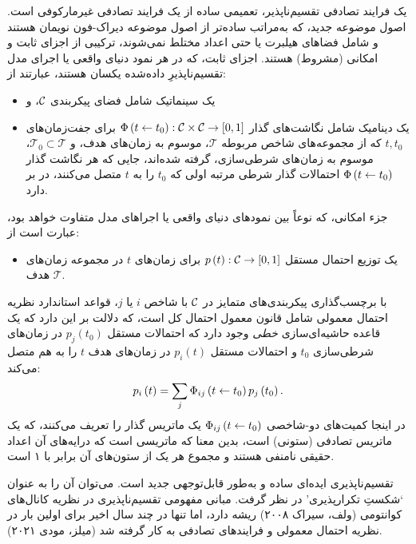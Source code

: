 \documentclass{article}
\newcommand{\stochasticmatrix}{\Phi}
\begin{document}
یک فرایند تصادفی تقسیم‌ناپذیر، تعمیمی ساده از یک فرایند تصادفی غیرمارکوفی است. اصول موضوعه جدید، که به‌مراتب ساده‌تر از اصول موضوعه دیراک-فون نویمان هستند و شامل فضاهای هیلبرت یا حتی اعداد مختلط نمی‌شوند، ترکیبی از اجزای ثابت و امکانی (مشروط) هستند. اجزای ثابت، که در هر نمود دنیای واقعی یا اجرای مدل تقسیم‌ناپذیرِ داده‌شده یکسان هستند، عبارتند از:
\begin{itemize}
\item یک سینماتیک شامل فضای پیکربندی $\mathcal{C}$، و
\item یک دینامیک شامل نگاشت‌های گذار $\mapping{\stochasticmatrix\left(t\from t_{0}\right)}{\configspace\cartesianprod\configspace}{\left[0,1\right]}$
برای جفت‌زمان‌های $t,t_{0}$ که از مجموعه‌های شاخص مربوطه $\mathcal{T}$، موسوم به زمان‌های هدف، و $\mathcal{T}_{0}\subset\mathcal{T}$، موسوم به زمان‌های شرطی‌سازی، گرفته شده‌اند، جایی که هر نگاشت گذار $\stochasticmatrix\left(t\from t_{0}\right)$ احتمالات گذار شرطی مرتبه اولی که $t_{0}$ را به $t$ متصل می‌کنند، در بر دارد.
\end{itemize}
جزء امکانی، که نوعاً بین نمودهای دنیای واقعی یا اجراهای مدل متفاوت خواهد بود، عبارت است از:
\begin{itemize}
\item یک توزیع احتمال مستقل $p\left(t\right):\mathcal{C}\to\left[0,1\right]$
برای زمان‌های $t$ در مجموعه زمان‌های هدف $\mathcal{T}$.
\end{itemize}
با برچسب‌گذاری پیکربندی‌های متمایز در $\mathcal{C}$ با شاخص $i$ یا $j$، قواعد استاندارد نظریه احتمال معمولی شامل قانون معمول احتمال کل است، که دلالت بر این دارد که یک قاعده حاشیه‌ای‌سازی \emph{خطی} وجود دارد که احتمالات مستقل $p_{j}\left(t_{0}\right)$ در زمان‌های شرطی‌سازی $t_{0}$ و احتمالات مستقل $p_{i}\left(t\right)$ در زمان‌های هدف $t$ را به هم متصل می‌کند:
\begin{equation}
p_{i}\left(t\right)=\sum_{j}\stochasticmatrix_{ij}\left(t\from t_{0}\right)p_{j}\left(t_{0}\right).\label{eq:LawOfTotalProbabilityFromTransitionMatrix}
\end{equation}
 در اینجا کمیت‌های دو-شاخصی $\stochasticmatrix_{ij}\left(t\from t_{0}\right)$ یک ماتریس گذار را تعریف می‌کنند، که یک ماتریس تصادفی (ستونی) است، بدین معنا که ماتریسی است که درایه‌های آن اعداد حقیقی نامنفی هستند و مجموع هر یک از ستون‌های آن برابر با ۱ است.

تقسیم‌ناپذیری ایده‌ای ساده و به‌طور قابل‌توجهی جدید است. می‌توان آن را به عنوان \textquoteleft شکستِ تکرارپذیری\textquoteright{} در نظر گرفت. مبانی مفهومی تقسیم‌ناپذیری در نظریه کانال‌های کوانتومی (ولف، سیراک ۲۰۰۸)\nocite{WolfCirac:2008dqc} ریشه دارد، اما تنها در چند سال اخیر برای اولین بار در نظریه احتمال معمولی و فرایندهای تصادفی به کار گرفته شد (میلز، مودی ۲۰۲۱)\nocite{MilzModi:2021qspaqnp}.
\end{document}
